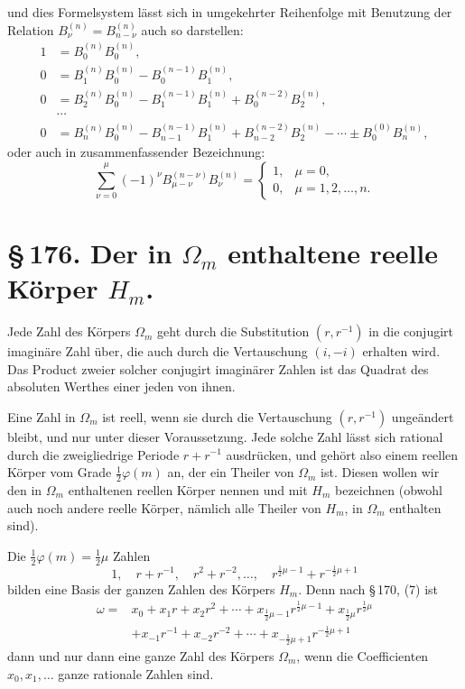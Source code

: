 \documentclass[11pt]{article}
\begin{document}
und dies Formelsystem lässt sich in umgekehrter Reihenfolge mit Benutzung der Relation $B_\nu^{(n)}=B_{n-\nu}^{(n)}$ auch so darstellen:
\begin{equation}
\begin{aligned}
1&=B_0^{(n)}B_0^{(n)},\\
0&=B_1^{(n)}B_0^{(n)}-B_0^{(n-1)}B_1^{(n)},\\
0&=B_2^{(n)}B_0^{(n)}-B_1^{(n-1)}B_1^{(n)}+B_0^{(n-2)}B_2^{(n)},\\
&\cdots\\
0&=B_n^{(n)}B_0^{(n)}-B_{n-1}^{(n-1)}B_1^{(n)}+B_{n-2}^{(n-2)}B_2^{(n)}-\cdots\pm B_0^{(0)}B_n^{(n)},
\end{aligned}
\tag{7}
\end{equation}
oder auch in zusammenfassender Bezeichnung:
\begin{equation}
 \sum_{\nu=0}^{\mu}(-1)^\nu B_{\mu-\nu}^{(n-\nu)}B_\nu^{(n)}
 =\begin{cases}
 1,&\mu=0,\\
 0,&\mu=1,2,\ldots,n.
 \end{cases}
\tag{8}
\end{equation}

\clearpage
\section*{\S\,176. Der in $\Omega_m$ enthaltene reelle Körper $H_m$.}

Jede Zahl des Körpers $\Omega_m$ geht durch die Substitution $(r,r^{-1})$ in die conjugirt imaginäre Zahl über, die auch durch die Vertauschung $(i,-i)$ erhalten wird. Das Product zweier solcher conjugirt imaginärer Zahlen ist das Quadrat des absoluten Werthes einer jeden von ihnen.

Eine Zahl in $\Omega_m$ ist reell, wenn sie durch die Vertauschung $(r,r^{-1})$ ungeändert bleibt, und nur unter dieser Voraussetzung. Jede solche Zahl lässt sich rational durch die zweigliedrige Periode $r+r^{-1}$ ausdrücken, und gehört also einem reellen Körper vom Grade $\frac12\varphi(m)$ an, der ein Theiler von $\Omega_m$ ist. Diesen wollen wir den in $\Omega_m$ enthaltenen reellen Körper nennen und mit $H_m$ bezeichnen (obwohl auch noch andere reelle Körper, nämlich alle Theiler von $H_m$, in $\Omega_m$ enthalten sind).

Die $\frac12\varphi(m)=\frac12\mu$ Zahlen
\begin{equation}
1,\quad r+r^{-1},\quad r^2+r^{-2},\ldots,\quad r^{\frac12\mu-1}+r^{-\frac12\mu+1}
\tag{1}
\end{equation}
bilden eine Basis der ganzen Zahlen des Körpers $H_m$. Denn nach \S\,170, (7) ist
\begin{equation}
\begin{aligned}
\omega={}&x_0+x_1r+x_2r^2+\cdots+x_{\frac12\mu-1}r^{\frac12\mu-1}+x_{\frac12\mu}r^{\frac12\mu} \\
&+x_{-1}r^{-1}+x_{-2}r^{-2}+\cdots+x_{-\frac12\mu+1}r^{-\frac12\mu+1}
\end{aligned}
\tag{2}
\end{equation}
dann und nur dann eine ganze Zahl des Körpers $\Omega_m$, wenn die Coefficienten $x_0,x_1,\ldots$ ganze rationale Zahlen sind.
\end{document}
